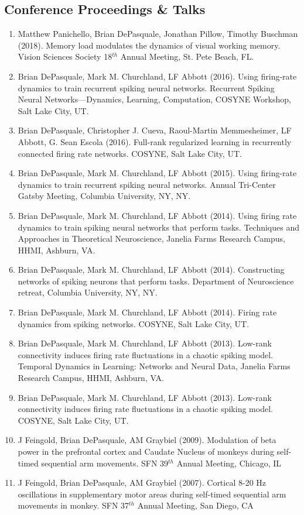\documentclass[margin, 10pt]{res}
\begin{document}
\begin{resume}
\newpage

\section{\textnormal\bf{Conference Proceedings \& Talks}} 

\begin{enumerate}[label={}]
\itemsep 0.75em 
\item Matthew Panichello, Brian DePasquale, Jonathan Pillow, Timothy Buschman (2018). Memory load modulates the dynamics of visual working memory. Vision Sciences Society 18$^{th}$ Annual Meeting, St. Pete Beach, FL.
\item Brian DePasquale, Mark M. Churchland, LF Abbott (2016). Using firing-rate dynamics to train recurrent spiking neural networks. Recurrent Spiking Neural Networks---Dynamics, Learning, Computation, COSYNE Workshop, Salt Lake City, UT.
\item Brian DePasquale, Christopher J. Cueva, Raoul-Martin Memmesheimer, LF Abbott, G. Sean Escola (2016). Full-rank regularized learning in recurrently connected firing rate networks. COSYNE, Salt Lake City, UT.
\item Brian DePasquale, Mark M. Churchland, LF Abbott (2015). Using firing-rate dynamics to train recurrent spiking neural networks. Annual Tri-Center Gatsby Meeting, Columbia University, NY, NY.
\item Brian DePasquale, Mark M. Churchland, LF Abbott (2014). Using firing rate dynamics to train spiking neural networks that perform tasks. Techniques and Approaches in Theoretical Neuroscience, Janelia Farms Research Campus, HHMI, Ashburn, VA.
\item Brian DePasquale, Mark M. Churchland, LF Abbott (2014). Constructing networks of spiking neurons that perform tasks. Department of Neuroscience retreat, Columbia University, NY, NY.
\item Brian DePasquale, Mark M. Churchland, LF Abbott (2014). Firing rate dynamics from spiking networks. COSYNE, Salt Lake City, UT.
\item Brian DePasquale, Mark M. Churchland, LF Abbott (2013). Low-rank connectivity induces firing rate fluctuations in a chaotic spiking model. Temporal Dynamics in Learning: Networks and Neural Data, Janelia Farms Research Campus, HHMI, Ashburn, VA.
\item Brian DePasquale, Mark M. Churchland, LF Abbott (2013). Low-rank connectivity induces firing rate fluctuations in a chaotic spiking model. COSYNE, Salt Lake City, UT.
\item J Feingold, Brian DePasquale, AM Graybiel (2009). Modulation of beta power in the prefrontal cortex and Caudate Nucleus of monkeys during self-timed sequential arm movements. SFN 39$^{th}$ Annual Meeting, Chicago, IL
\item J Feingold, Brian DePasquale, AM Graybiel (2007). Cortical 8-20 Hz oscillations in supplementary motor areas during self-timed sequential arm movements in monkey. SFN 37$^{th}$ Annual Meeting, San Diego, CA
\end{enumerate}

\end{resume}
\end{document}
